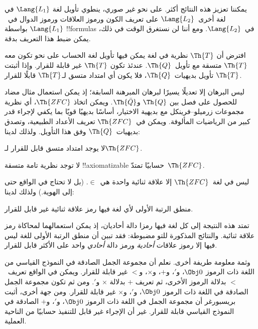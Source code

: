 \documentclass[../../../include/open-logic-section]{subfiles}
\begin{document}


يمكننا تعزيز هذه النتائج أكثر. على نحو غير صوري، ينطوي تأويل لغة
$\Lang{L_1}$ في لغة أخرى~$\Lang{L_2}$ على تعريف الكون ورموز العلاقات
ورموز الدوال في~$\Lang{L_1}$ بواسطة !!{formula}s في~$\Lang{L_2}$.
ومع أننا لن نستغرق الوقت في ذلك، يمكن ضبط هذا التعريف بدقة.

\begin{thm}
  افترض أن $\Th{T}$ نظرية في لغة يمكن فيها تأويل لغة الحساب على نحو
  تكون معه $\Th{T}$ متسقة مع تأويل~$\Th{Q}$. عندئذ تكون $\Th{T}$ غير
  قابلة للقرار. وإذا أثبتت $\Th{T}$ تأويل بديهيات~$\Th{Q}$، فلا يكون
  أي امتداد متسق لـ$\Th{T}$ قابلًا للقرار.
\end{thm}

ليس البرهان إلا تعديلًا يسيرًا لبرهان المبرهنة السابقة؛ إذ يمكن
استعمال مثال مضاد للحصول على فصل بين $\Th{Q}$ و$\Th{\bar Q}$. ويمكن
اتخاذ $\Th{ZFC}$، أي نظرية مجموعات زرميلو--فرينكل مع بديهية الاختيار،
أساسًا بديهيًا قويًا بما يكفي لإجراء قدر كبير من الرياضيات المألوفة.
ويمكن في~$\Th{ZFC}$ تعريف الأعداد الطبيعية، وتصدق بديهيات~$\Th{Q}$
وفق هذا التأويل. ولذلك لدينا:

\begin{cor}
لا يوجد امتداد متسق قابل للقرار لـ$\Th{ZFC}$.
\end{cor}

\begin{cor}
لا توجد نظرية تامة متسقة !!{axiomatizable} حسابيًا تمتدّ~$\Th{ZFC}$.
\end{cor}

ليس في لغة~$\Th{ZFC}$ إلا علاقة ثنائية واحدة هي~$\in$. (بل لا تحتاج
في الواقع حتى إلى الهوية.) ولذلك لدينا:

\begin{cor}
منطق الرتبة الأولى لأي لغة فيها رمز علاقة ثنائية غير قابل للقرار.
\end{cor}

تمتد هذه النتيجة إلى كل لغة فيها رمزا دالة أحاديان، إذ يمكن استعمالهما
لمحاكاة رمز علاقة ثنائية. والنتائج المذكورة للتو مضبوطة: فقد تبين أن
منطق الرتبة الأولى للغة ليس فيها إلا رموز علاقات \emph{أحادية} ورمز
دالة \emph{أحادي} واحد على الأكثر قابل للقرار.

وثمة معلومة طريفة أخرى. نعلم أن مجموعة الجمل الصادقة في النموذج
القياسي من اللغة ذات الرموز $\Obj 0$، و$'$، و$+$، و$\times$، و$<$ غير
قابلة للقرار. ويمكن في الواقع تعريف~$<$ بدلالة الرموز الأخرى، ثم تعريف
$+$ بدلالة $\times$ و$'$. ومن ثم تكون مجموعة الجمل الصادقة في اللغة
ذات الرموز $\Obj 0$، و$'$، و$\times$ غير قابلة للقرار. ومن جهة أخرى،
أثبت بريسبورغر أن مجموعة الجمل في اللغة ذات الرموز $\Obj 0$، و$'$،
و$+$ الصادقة في النموذج القياسي قابلة للقرار. غير أن الإجراء غير قابل
للتنفيذ حسابيًا من الناحية العملية.
\end{document}
